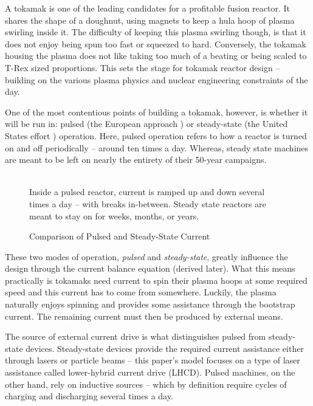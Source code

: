 A tokamak is one of the leading candidates for a profitable fusion reactor. It shares the shape of a doughnut, using magnets to keep a hula hoop of plasma swirling inside it. The difficulty of keeping this plasma swirling though, is that it does not enjoy being spun too fast or squeezed to hard. Conversely, the tokamak housing the plasma does not like taking too much of a beating or being scaled to T-Rex sized proportions. This sets the stage for tokamak reactor design -- building on the various plasma physics and nuclear engineering constraints of the day. 

One of the most contentious points of building a tokamak, however, is whether it will be run in: pulsed (the European approach \cite{eupulsed}) or steady-state (the United States effort \cite{ussteady}) operation. Here, pulsed operation refers to how a reactor is turned on and off periodically -- around ten times a day. Whereas, steady state machines are meant to be left on nearly the entirety of their 50-year campaigns.

\begin{figure}
	\centering
	\begin{adjustbox}{width=0.75\textwidth}
		
	\end{adjustbox}
	\caption{Comparison of Pulsed and Steady-State Current} ~\\
	\small Inside a pulsed reactor, current is ramped up and down several times a day -- with breaks in-between. Steady state reactors are meant to stay on for weeks, months, or years.
\end{figure}

These two modes of operation, \emph{pulsed} and \emph{steady-state}, greatly influence the design through the current balance equation (derived later). What this means practically is tokamaks need current to spin their plasma hoops at some required speed and this current has to come from somewhere. Luckily, the plasma naturally enjoys spinning and provides some assistance through the bootstrap current. The remaining current must then be produced by external means.

The source of external current drive is what distinguishes pulsed from steady-state devices. Steady-state devices provide the required current assistance either through lasers or particle beams -- this paper's model focuses on a type of laser assistance called lower-hybrid current drive (LHCD). \cite{jeff} Pulsed machines, on the other hand, rely on inductive sources -- which by definition require cycles of charging and discharging several times a day.


